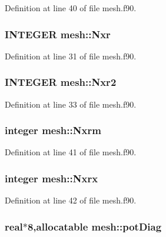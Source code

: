 Definition at line 40 of file mesh.f90.

\hypertarget{namespacemesh_a4fae0f9e86bfdcb8fec5dc0aefd8fe71}{
\subsubsection[{Nxr}]{\setlength{\rightskip}{0pt plus 5cm}INTEGER {\bf mesh::Nxr}}}
\label{namespacemesh_a4fae0f9e86bfdcb8fec5dc0aefd8fe71}


Definition at line 31 of file mesh.f90.

\hypertarget{namespacemesh_a7838433bd66eb8c9d5155928904d9a5a}{
\subsubsection[{Nxr2}]{\setlength{\rightskip}{0pt plus 5cm}INTEGER {\bf mesh::Nxr2}}}
\label{namespacemesh_a7838433bd66eb8c9d5155928904d9a5a}


Definition at line 33 of file mesh.f90.

\hypertarget{namespacemesh_a3dc98a3a965cb38fc45c4b7801f0f3d2}{
\subsubsection[{Nxrm}]{\setlength{\rightskip}{0pt plus 5cm}integer {\bf mesh::Nxrm}}}
\label{namespacemesh_a3dc98a3a965cb38fc45c4b7801f0f3d2}


Definition at line 41 of file mesh.f90.

\hypertarget{namespacemesh_a3836bb9dd0f99e784aecf5ffac36418a}{
\subsubsection[{Nxrx}]{\setlength{\rightskip}{0pt plus 5cm}integer {\bf mesh::Nxrx}}}
\label{namespacemesh_a3836bb9dd0f99e784aecf5ffac36418a}


Definition at line 42 of file mesh.f90.

\hypertarget{namespacemesh_a6e7109b1ed1096ce6c3dbacaa4920158}{
\subsubsection[{potDiag}]{\setlength{\rightskip}{0pt plus 5cm}real$\ast$8,allocatable {\bf mesh::potDiag}}}
\label{namespacemesh_a6e7109b1ed1096ce6c3dbacaa4920158}


